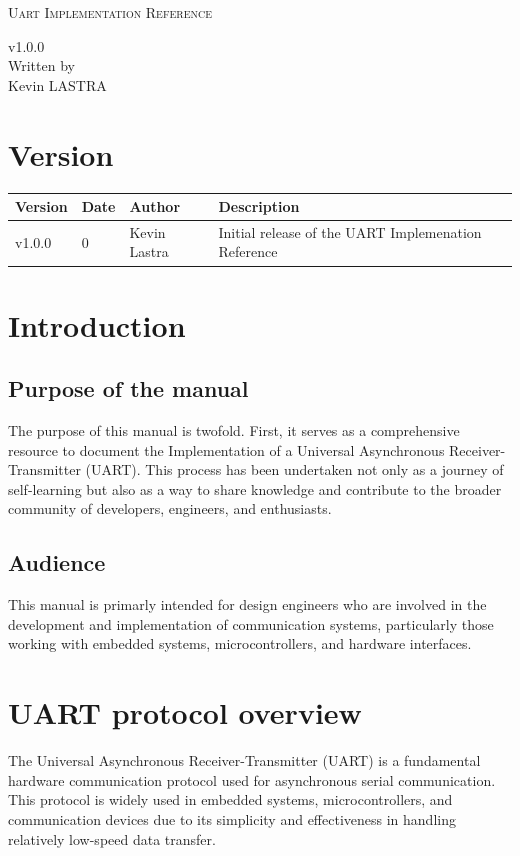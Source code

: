 \documentclass[12pt]{article}
\def\UART_VERSION{v1.0.0}
\begin{document}
\begin{titlepage}
  \centering
  {\LARGE \textsc{Uart Implementation Reference}\par}
  {\vspace{1cm}}
  \UART_VERSION \\
  {\vspace{16cm}}
  Written by \\
  Kevin LASTRA
\end{titlepage}
\tableofcontents
\newpage

\section{Version}
\begin{tabular}{|p{1.5cm}|p{1.5cm}|p{2.5cm}|p{7cm}|}
  \hline
  \rowcolor{light-gray}\textbf{Version} & \textbf{Date} & \textbf{Author} & \textbf{Description} \\
  \hline
  v1.0.0 & 0 & Kevin Lastra & Initial release of the UART Implemenation Reference \\
  \hline
\end{tabular}
\newpage
\section{Introduction}
\subsection{Purpose of the manual}
The purpose of this manual is twofold. First, it serves as a 
comprehensive resource to document the Implementation of a 
Universal Asynchronous Receiver-Transmitter (UART). This process 
has been undertaken not only as a journey of self-learning but also 
as a way to share knowledge and contribute to the broader community
of developers, engineers, and enthusiasts.

\subsection{Audience}
This manual is primarly intended for design engineers who are 
involved in the development and implementation of communication
systems, particularly those working with embedded systems, 
microcontrollers, and hardware interfaces.

\newpage
\section{UART protocol overview}
The Universal Asynchronous Receiver-Transmitter (UART) is a 
fundamental hardware communication protocol used for asynchronous
serial communication. \\
This protocol is widely used in embedded systems, 
microcontrollers, and communication devices due to its simplicity and effectiveness
in handling relatively low-speed data transfer.
\end{document}
